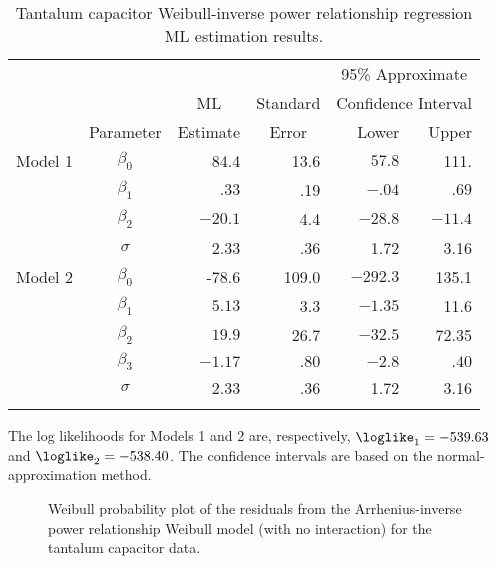 \begin{table}
\caption{Tantalum capacitor Weibull-inverse power relationship 
regression ML estimation results.}
\centering\small
\begin{tabular}{lcrrrr}
\\[-.5ex] \hline
& & & & \multicolumn{2}{c}{95\% Approximate}\\
&&\multicolumn{1}{c}{ML} &Standard & \multicolumn{2}{c}{Confidence
Interval}\\ \cline{5-6}
& Parameter & Estimate&
\multicolumn{1}{c}{Error} & Lower & Upper \\
\hline 
Model 1 
&$\beta_{0}$ &84.4 &13.6 &$57.8$ &111. \\[.7ex] 
&$\beta_{1}$ &$.33$  &.19 &$-.04$ &$.69$ \\[.7ex] 
&$\beta_{2}$ &$-20.1$  &4.4  & $-28.8$  & $-11.4$\\[.7ex] 
&$\sigma$ &2.33 &.36 &1.72 & 3.16 \\[1.2ex]
\hline 
Model 2 
&$\beta_{0}$ &-78.6 &109.0 &$-292.3$ &135.1 \\[.7ex] 
&$\beta_{1}$ &$5.13$ &3.3 & $-1.35$ &11.6 \\[.7ex]
&$\beta_{2}$ & $19.9$ &26.7 &$-32.5$ &72.35 \\[.7ex]  
&$\beta_{3}$ &$-1.17$ &$.80$ & $-2.8$ &$.40$ \\[.7ex] 
&$\sigma$ &2.33 &.36 &1.72 &3.16 \\[1.2ex]
\hline 
\\[-1.8ex]
\end{tabular}
\begin{minipage}[t]{4in}
The log likelihoods for Models 1 and 2 are, 
respectively, $\loglike_{1}=-539.63 $
and $\loglike_{2}=-538.40 $. The confidence intervals 
are based on the normal-approximation method.
\end{minipage}
\label{table:tantalum.mles}
\end{table}

\begin{figure}
\caption{Weibull probability plot of the residuals from the Arrhenius-inverse 
power relationship Weibull model (with no interaction) for
the tantalum capacitor data.}
\label{figure:tantalum.residual.linear.weib.ps}
\end{figure}


